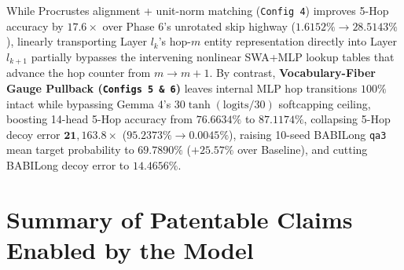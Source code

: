 \documentclass[11pt,letterpaper]{article}
\theoremstyle{definition}
\begin{document}
While Procrustes alignment + unit-norm matching (\texttt{Config 4}) improves 5-Hop accuracy by $17.6\times$ over Phase 6's unrotated skip highway ($1.6152\% \to 28.5143\%$), linearly transporting Layer $l_k$'s hop-$m$ entity representation directly into Layer $l_{k+1}$ partially bypasses the intervening nonlinear SWA+MLP lookup tables that advance the hop counter from $m \to m+1$. By contrast, \textbf{Vocabulary-Fiber Gauge Pullback (\texttt{Configs 5 \& 6})} leaves internal MLP hop transitions $100\%$ intact while bypassing Gemma 4's $30\tanh(\text{logits}/30)$ softcapping ceiling, boosting 14-head 5-Hop accuracy from $76.6634\%$ to $\mathbf{87.1174\%}$, collapsing 5-Hop decoy error $\mathbf{21,163.8\times}$ ($95.2373\% \to 0.0045\%$), raising 10-seed BABILong \texttt{qa3} mean target probability to $\mathbf{69.7890\%}$ ($+25.57\%$ over Baseline), and cutting BABILong decoy error to $\mathbf{14.4656\%}$.

\section{Summary of Patentable Claims Enabled by the Model}
\end{document}
